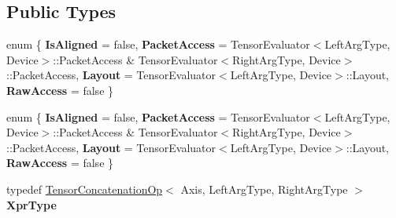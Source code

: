 \subsection*{Public Types}
\begin{DoxyCompactItemize}
\item 
\mbox{\label{struct_eigen_1_1_tensor_evaluator_3_01const_01_tensor_concatenation_op_3_01_axis_00_01_left_arg_e37e1b61d31098a96aab7c22793b325c_a8586e29dd5702211da0b9bcb17f2b8e0}} 
enum \{ {\bfseries Is\+Aligned} = false, 
{\bfseries Packet\+Access} = Tensor\+Evaluator$<$Left\+Arg\+Type, Device$>$\+:\+:Packet\+Access \& Tensor\+Evaluator$<$Right\+Arg\+Type, Device$>$\+:\+:Packet\+Access, 
{\bfseries Layout} = Tensor\+Evaluator$<$Left\+Arg\+Type, Device$>$\+:\+:Layout, 
{\bfseries Raw\+Access} = false
 \}
\item 
\mbox{\label{struct_eigen_1_1_tensor_evaluator_3_01const_01_tensor_concatenation_op_3_01_axis_00_01_left_arg_e37e1b61d31098a96aab7c22793b325c_aebfbf3a890c93eaa9e453bba36fffd3e}} 
enum \{ {\bfseries Is\+Aligned} = false, 
{\bfseries Packet\+Access} = Tensor\+Evaluator$<$Left\+Arg\+Type, Device$>$\+:\+:Packet\+Access \& Tensor\+Evaluator$<$Right\+Arg\+Type, Device$>$\+:\+:Packet\+Access, 
{\bfseries Layout} = Tensor\+Evaluator$<$Left\+Arg\+Type, Device$>$\+:\+:Layout, 
{\bfseries Raw\+Access} = false
 \}
\item 
\mbox{\label{struct_eigen_1_1_tensor_evaluator_3_01const_01_tensor_concatenation_op_3_01_axis_00_01_left_arg_e37e1b61d31098a96aab7c22793b325c_aa8d04d04d3156671aba3f381c8edd01f}} 
typedef \hyperlink{class_eigen_1_1_tensor_concatenation_op}{Tensor\+Concatenation\+Op}$<$ Axis, Left\+Arg\+Type, Right\+Arg\+Type $>$ {\bfseries Xpr\+Type}
\item 
\mbox{\label{struct_eigen_1_1_tensor_evaluator_3_01const_01_tensor_concatenation_op_3_01_axis_00_01_left_arg_e37e1b61d31098a96aab7c22793b325c_a37e38b08c8154c376e692efe0d9be9e2}} 

\end{DoxyCompactItemize}
